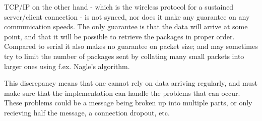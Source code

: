 \documentclass[11pt]{article}
\begin{document}
TCP/IP on the other hand - which is the wireless protocol for a sustained server/client connection - is not synced, nor does it make any guarantee on any communication speeds. The only guarantee is that the data will arrive at some point, and that it will be possible to retrieve the packages in proper order. Compared to serial it also makes no guarantee on packet size; and may sometimes try to limit the number of packages sent by collating many small packets into larger ones using f.ex. Nagle's algorithm. \par

This discrepancy means that one cannot rely on data arriving regularly, and must make sure that the implementation can handle the problems that can occur. These problems could be a message being broken up into multiple parts, or only recieving half the message, a connection dropout, etc.
\end{document}
